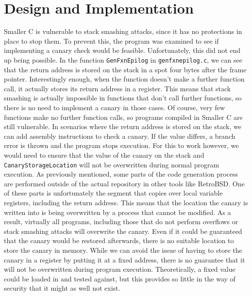 \documentclass[sigconf, anonymous]{acmart}
\newcommand{\code}[1]{\texttt{#1}}
\begin{document}
\section{Design and Implementation}
\label{design}

Smaller C is vulnerable to stack smashing attacks, since it has no protections in place to stop them. To prevent this, the program was examined to see if implementing a canary check would be feasible. Unfortunately, this did not end up being possible. In the function \code{GenFxnEpilog} in \code{genfxnepilog.c}, we can see that the return address is stored on the stack in a spot four bytes after the frame pointer. Interestingly enough, when the function doesn’t make a further function call, it actually stores its return address in a register. This means that stack smashing is actually impossible in functions that don’t call further functions, so there is no need to implement a canary in those cases. Of course, very few functions make no further function calls, so programs compiled in Smaller C are still vulnerable. In scenarios where the return address is stored on the stack, we can add assembly instructions to check a canary. If the value differs, a branch error is thrown and the program stops execution. For this to work however, we would need to ensure that the value of the canary on the stack and \code{CanaryStorageLocation} will not be overwritten during normal program execution. As previously mentioned, some parts of the code generation process are performed outside of the actual repository in other tools like RetroBSD. One of these parts is unfortunately the segment that copies over local variable registers, including the return address. This means that the location the canary is written into is being overwritten by a process that cannot be modified. As a result, virtually all programs, including those that do not perform overflows or stack smashing attacks will overwrite the canary. Even if it could be guaranteed that the canary would be restored afterwards, there is no suitable location to store the canary in memory. While we can avoid the issue of having to store the canary in a register by putting it at a fixed address, there is no guarantee that it will not be overwritten during program execution. Theoretically, a fixed value could be loaded in and tested against, but this provides so little in the way of security that it might as well not exist. 
\end{document}
